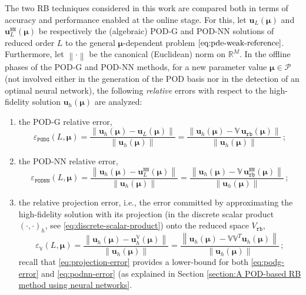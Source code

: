 \documentclass[12pt, a4paper, twoside, openright, notitlepage]{report}
\numberwithin{equation}{chapter}
\theoremstyle{theorem}
\theoremstyle{definition}
\theoremstyle{remark}
\theoremstyle{proposition}
\numberwithin{figure}{chapter}
\newcommand{\norm}[1]{\left\lVert#1\right\rVert}
\newcommand{\bg}[1]{\boldsymbol{#1}}
\begin{document}
		The two RB techniques considered in this work are compared both in terms of accuracy and performance enabled at the online stage. For this, let $\mathbf{u}_L(\bg{\mu})$ and $\mathbf{u}_L^{\texttt{NN}}(\bg{\mu})$ be respectively the (algebraic) POD-G and POD-NN solutions of reduced order $L$ to the general $\bg{\mu}$-dependent problem $\eqref{eq:pde-weak-reference}$. Furthermore, let $\norm{\cdot}$ be the canonical (Euclidean) norm on $\mathbb{R}^M$. In the offline phases of the POD-G and POD-NN methods, for a new parameter value $\bg{\mu} \in \mathcal{P}$ (not involved either in the generation of the POD basis nor in the detection of an optimal neural network), the following \emph{relative} errors with respect to the high-fidelity solution $\mathbf{u}_h(\bg{\mu})$ are analyzed:
		\begin{enumerate}[label=(\alph*)]
			\item the POD-G relative error,
			\begin{equation}
				\label{eq:podg-error}
				\varepsilon_{\texttt{PODG}}^{}(L, \bg{\mu}) = \dfrac{\norm{\mathbf{u}_h(\bg{\mu}) - \mathbf{u}_L(\bg{\mu})}}{\norm{\mathbf{u}_h(\bg{\mu})}} = \dfrac{\norm{\mathbf{u}_h(\bg{\mu}) - \mathbb{V} \, \mathbf{u}_{\texttt{rb}}(\bg{\mu})}}{\norm{\mathbf{u}_h(\bg{\mu})}} \, ;
			\end{equation} 
			\item the POD-NN relative error,
			\begin{equation}
				\label{eq:podnn-error}
				\varepsilon_{\texttt{PODNN}}^{}(L, \bg{\mu}) = \dfrac{\norm{\mathbf{u}_h(\bg{\mu}) - \mathbf{u}_L^{\texttt{NN}}(\bg{\mu})}}{\norm{\mathbf{u}_h(\bg{\mu})}} = \dfrac{\norm{\mathbf{u}_h(\bg{\mu}) - \mathbb{V} \, \mathbf{u}_{\texttt{rb}}^{\texttt{NN}}(\bg{\mu})}}{\norm{\mathbf{u}_h(\bg{\mu})}} \, ;
			\end{equation} 
			\item the relative projection error, i.e., the error committed by approximating the high-fidelity solution with its projection (in the discrete scalar product $(\cdot,\cdot)_h$, see \eqref{eq:discrete-scalar-product}) onto the reduced space $V_{\texttt{rb}}$,
			\begin{equation}
				\label{eq:projection-error}
				\varepsilon_{\mathbb{V}}^{}(L, \bg{\mu}) = \dfrac{\norm{\mathbf{u}_h(\bg{\mu}) - \mathbf{u}_h^{\mathbb{V}}(\bg{\mu})}}{\norm{\mathbf{u}_h(\bg{\mu})}} = \dfrac{\norm{\mathbf{u}_h(\bg{\mu}) - \mathbb{V} \mathbb{V}^T \mathbf{u}_h(\bg{\mu})}}{\norm{\mathbf{u}_h(\bg{\mu})}} \, ;
			\end{equation}
			recall that \eqref{eq:projection-error} provides a lower-bound for both \eqref{eq:podg-error} and \eqref{eq:podnn-error} (as explained in Section \ref{section:A POD-based RB method using neural networks}. 
		\end{enumerate}
\end{document}
